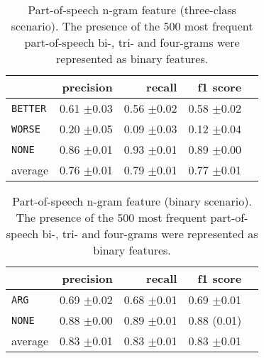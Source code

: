 	\begin{table}[htbp] 
		\centering 
		\caption{Part-of-speech n-gram feature (three-class scenario). The presence of the 500 most frequent part-of-speech bi-, tri- and four-grams were represented as binary features.} 
		\label{  }
		\begin{tabular}{@{}lrrrr@{}}
			\toprule
			        & precision                & recall                   & f1 score                 \\ \midrule 
	\texttt{BETTER}	&	 0.61 \scriptsize{$\pm$0.03} &	 0.56 \scriptsize{$\pm$0.02} &	 0.58 \scriptsize{$\pm$0.02}  \\ 
	\texttt{WORSE}	&	 0.20 \scriptsize{$\pm$0.05} &	 0.09 \scriptsize{$\pm$0.03} &	 0.12 \scriptsize{$\pm$0.04}  \\ 
	\texttt{NONE}	&	 0.86 \scriptsize{$\pm$0.01} &	 0.93 \scriptsize{$\pm$0.01} &	 0.89 \scriptsize{$\pm$0.00}  \\ 
average	&	 0.76 \scriptsize{$\pm$0.01} &	 0.79 \scriptsize{$\pm$0.01} &	 0.77 \scriptsize{$\pm$0.01}  \\ 
			\bottomrule
		\end{tabular}
	\end{table}
	
	\begin{table}[htbp] 
		\centering 
		\caption{Part-of-speech n-gram feature (binary scenario). The presence of the 500 most frequent part-of-speech bi-, tri- and four-grams were represented as binary features.} 
		\label{  }
		\begin{tabular}{@{}lrrrr@{}}
			\toprule
			        & precision                & recall                   & f1 score                 \\ \midrule 
			\texttt{ARG}	&	 0.69 \scriptsize{$\pm$0.02} &	 0.68 \scriptsize{$\pm$0.01} &	 0.69 \scriptsize{$\pm$0.01}  \\ 
	\texttt{NONE}	&	 0.88 \scriptsize{$\pm$0.00} &	 0.89 \scriptsize{$\pm$0.01} &	 0.88 \scriptsize{(0.01)}  \\ 
average	&	 0.83 \scriptsize{$\pm$0.01} &	 0.83 \scriptsize{$\pm$0.01} &	 0.83 \scriptsize{$\pm$0.01}  \\ 
			\bottomrule
		\end{tabular}
	\end{table}
	

